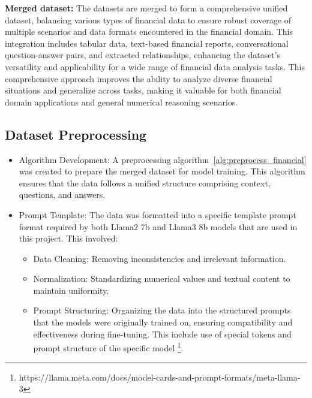 \documentclass[logo,msc]{infthesis}           %
\begin{document}
\textbf{Merged dataset: } The datasets are merged to form a comprehensive unified dataset, balancing various types of financial data to ensure robust coverage of multiple scenarios and data formats encountered in the financial domain. This integration includes tabular data, text-based financial reports, conversational question-answer pairs, and extracted relationships, enhancing the dataset's versatility and applicability for a wide range of financial data analysis tasks. This comprehensive approach improves the ability to analyze diverse financial situations and generalize across tasks, making it valuable for both financial domain applications and general numerical reasoning scenarios.
\subsection{Dataset Preprocessing}
\begin{itemize}
    \item Algorithm Development: A preprocessing algorithm~\ref{alg:preprocess_financial} was created to prepare the merged dataset for model training. This algorithm ensures that the data follows a unified structure comprising context, questions, and answers.
    \item Prompt Template: The data was formatted into a specific template prompt format required by both Llama2 7b and Llama3 8b models that are used in this project. This involved:
    \begin{itemize}
        \item Data Cleaning: Removing inconsistencies and irrelevant information.
        \item Normalization: Standardizing numerical values and textual content to maintain uniformity.
        \item Prompt Structuring: Organizing the data into the structured prompts that the models were originally trained on, ensuring compatibility and effectiveness during fine-tuning. This include use of special tokens and prompt structure of the specific model \footnote{https://llama.meta.com/docs/model-cards-and-prompt-formats/meta-llama-3}. 
    \end{itemize}
\end{itemize}
\end{document}
